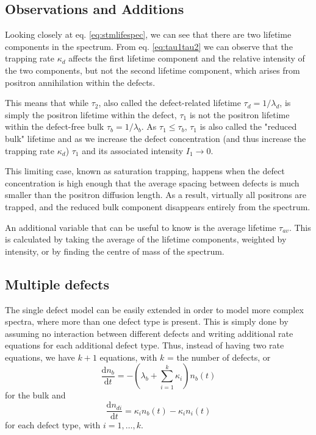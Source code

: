\subsection{Observations and Additions}

Looking closely at eq. \ref{eq:stmlifespec}, we can see that there are two lifetime components in the spectrum. From eq. \ref{eq:tau1tau2} we can observe that the trapping rate $\kappa_d$ affects the first lifetime component and the relative intensity of the two components, but not the second lifetime component, which arises from positron annihilation within the defects. 

This means that while $\tau_2$, also called the defect-related lifetime $\tau_d = 1/\lambda_d$, is simply the positron lifetime within the defect, $\tau_1$ is not the positron lifetime within the defect-free bulk $\tau_b = 1/\lambda_b$. As $\tau_1 \leq \tau_b$, $\tau_1$ is also called the "reduced bulk" lifetime and as we increase the defect concentration (and thus increase the trapping rate $\kappa_d$) $\tau_{1}$ and its associated intensity $I_{1} \to 0$.

This limiting case, known as saturation trapping, happens when the defect concentration is high enough that the average spacing between defects is much smaller than the positron diffusion length. As a result, virtually all positrons are trapped, and the reduced bulk component disappears entirely from the spectrum.

An additional variable that can be useful to know is the average lifetime $\tau_{av}$. This is calculated by taking the average of the lifetime components, weighted by intensity, or by finding the centre of mass of the spectrum.

\subsection{Multiple defects}

The single defect model can be easily extended in order to model more complex spectra, where more than one defect type is present. This is simply done by assuming no interaction between different defects and writing additional rate equations for each additional defect type. Thus, instead of having two rate equations, we have $k+1$ equations, with $k$ = the number of defects, or
\begin{equation}
    \dfrac{\mathrm{d}n_b}{\mathrm{d}t} = -\left(\lambda_b + \sum_{i=1}^{k} \kappa_i\right)n_b(t)
\end{equation}
for the bulk and
\begin{equation}
    \dfrac{\mathrm{d}n_{di}}{\mathrm{d}t} = \kappa_i n_b(t) - \kappa_i n_i(t)
\end{equation}
for each defect type, with $i = 1,\dots,k$.

